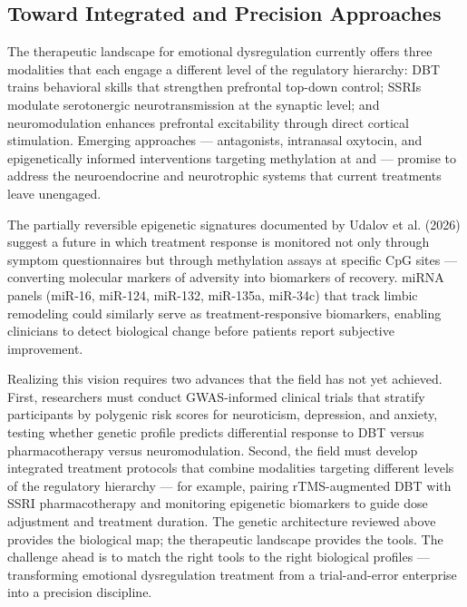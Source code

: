 \subsection*{Toward Integrated and Precision Approaches}

The therapeutic landscape for emotional dysregulation currently offers three
modalities that each engage a different level of the regulatory hierarchy:
DBT trains behavioral skills that strengthen prefrontal top-down control;
SSRIs modulate serotonergic neurotransmission at the synaptic level; and
neuromodulation enhances prefrontal excitability through direct cortical
stimulation.
Emerging approaches —  antagonists, intranasal oxytocin, and
epigenetically informed interventions targeting methylation at  and
 — promise to address the neuroendocrine and neurotrophic systems
that current treatments leave unengaged.

The partially reversible epigenetic signatures documented by Udalov et al.
(2026) suggest a future in which treatment response is monitored not only
through symptom questionnaires but through methylation assays at specific CpG
sites — converting molecular markers of adversity into biomarkers of
recovery.
miRNA panels (miR-16, miR-124, miR-132, miR-135a, miR-34c) that track limbic
remodeling could similarly serve as treatment-responsive biomarkers, enabling
clinicians to detect biological change before patients report subjective
improvement.

Realizing this vision requires two advances that the field has not yet achieved.
First, researchers must conduct GWAS-informed clinical trials that stratify
participants by polygenic risk scores for neuroticism, depression, and anxiety,
testing whether genetic profile predicts differential response to DBT versus
pharmacotherapy versus neuromodulation.
Second, the field must develop integrated treatment protocols that combine
modalities targeting different levels of the regulatory hierarchy —
for example, pairing rTMS-augmented DBT with SSRI pharmacotherapy and
monitoring epigenetic biomarkers to guide dose adjustment and treatment
duration.
The genetic architecture reviewed above provides the biological map;
the therapeutic landscape provides the tools.
The challenge ahead is to match the right tools to the right biological
profiles — transforming emotional dysregulation treatment from a trial-and-error
enterprise into a precision discipline.
